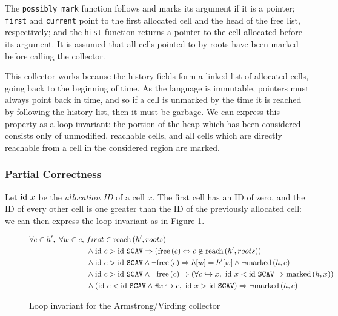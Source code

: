 The \texttt{possibly\_mark} function follows and marks its argument if
it is a pointer; \texttt{first} and \texttt{current} point to the
first allocated cell and the head of the free list, respectively; and
the \texttt{hist} function returns a pointer to the cell allocated
before its argument. It is assumed that all cells pointed to by roots
have been marked before calling the collector.

This collector works because the history fields form a linked list of
allocated cells, going back to the beginning of time. As the language
is immutable, pointers must always point back in time, and so if a
cell is unmarked by the time it is reached by following the history
list, then it must be garbage. We can express this property as a loop
invariant: the portion of the heap which has been considered consists
only of unmodified, reachable cells, and all cells which are directly
reachable from a cell in the considered region are marked.

\subsubsection{Partial Correctness}
\label{sec:marksweep-example-partial}

Let $\mathrm{id}~x$ be the \textit{allocation ID} of a cell $x$. The first
cell has an ID of zero, and the ID of every other cell is one greater
than the ID of the previously allocated cell: we can then express the
loop invariant as in Figure
\ref{fig:marksweep-example-partial-invariant}.

\begin{figure}[t]
  \centering
  \begin{align*}
    \forall c \in h',\ \forall w \in c,\ &first \in \reach{h'}{roots}\\
%
    &\land \id~c > \id~\mathtt{SCAV} \implies (\free{c}
      \iff c \notin \reach{h'}{roots})\\
%
    &\land \id~c > \id~\mathtt{SCAV} \land \lnot\free{c}
      \implies h[w] = h'[w] \land \lnot \marked{h}{c}\\
%
    &\land \id~c > \id~\mathtt{SCAV} \land \lnot\free{c}
      \implies (\forall c \pointsto x,\ \id~x < \id~\mathtt{SCAV}
      \implies \marked{h}{x})\\
%
    &\land \left(\id~c < \id~\mathtt{SCAV} \land \nexists x \pointsto
      c,\ \id~x > \id~\mathtt{SCAV}\right) \implies \lnot\marked{h}{c}
  \end{align*}  
  \caption{Loop invariant for the Armstrong/Virding collector}
  \label{fig:marksweep-example-partial-invariant}
\end{figure}

